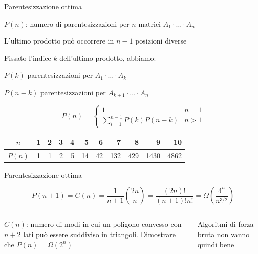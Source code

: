 \begin{frame}{Parentesizzazione ottima}

\vspace{-9pt}
\BIL
\item $P(n)$: numero di parentesizzazioni per $n$ matrici $A_1 \cdot \ldots \cdot A_n$
\item L'ultimo prodotto può occorrere in $n-1$ posizioni diverse
\item Fissato l'indice $k$ dell'ultimo prodotto, abbiamo:
\BI
\item $P(k)$ parentesizzazioni per $A_1 \cdot \ldots \cdot A_k$
\item $P(n-k)$ parentesizzazioni per $A_{k+1} \cdot \ldots \cdot A_n$
\EI
\EIL

\[
  P(n) = \begin{cases}
    1 & n = 1 \\
    \sum_{i=1}^{n-1} P(k)P(n-k) & n>1
    \end{cases}
\]

\smallskip
\begin{center}
\begin{tabular}{|c|r|r|r|r|r|r|r|r|r|r|}
\hline
$n$ & \phantom{0}1 & \phantom{0}2 & \phantom{0}3 & \phantom{0}4 & \phantom{0}5 & \phantom{0}6 & \phantom{0}7 & \phantom{0}8 & \phantom{0}9 & \phantom{0}10 \\\hline
$P(n)$ & 1 & 1 & 2 & 5 & 14 & 42 & 132 & 429 & 1430 & 4862 \\\hline
\end{tabular}
\end{center}
\end{frame}

\begin{frame}{Parentesizzazione ottima}

\vspace{-9pt}
\begin{myboxtitle}
\[
P(n+1) = C(n) = \frac{1}{n+1} {2n\choose n} = \frac{(2n)!}{(n+1)!n!} = \Omega\left(\frac{4^n}{n^{3/2}}\right)
\]
\end{myboxtitle}

\begin{columns}[T]
$C(n)$: numero di modi in cui un poligono convesso con $n+2$ lati può essere suddiviso in triangoli.
Dimostrare che $P(n) = \Omega(2^n)$

Algoritmi di forza bruta non vanno quindi bene
\end{columns}

\end{frame}

